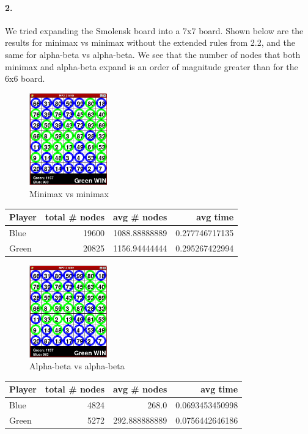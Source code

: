 \paragraph{2.}
We tried expanding the Smolensk board into a 7x7 board. Shown below are the results for minimax vs minimax without the extended rules from 2.2, and the same for alpha-beta vs alpha-beta. We see that the number of nodes that both minimax and alpha-beta expand is an order of magnitude greater than for the 6x6 board.

\begin{figure}[H]
\centering
\includegraphics[width=0.3\textwidth]{graphics/mm_bigger_7x7.png}
\caption{Minimax vs minimax}
\end{figure}
\begin{tabular}{l|r|r|r}
  Player & total \# nodes & avg \# nodes & avg time \\
  \hline
  Blue & 19600 & 1088.88888889 & 0.277746717135 \\
  Green & 20825 & 1156.94444444 & 0.295267422994 \\
\end{tabular}

\begin{figure}[H]
\centering
\includegraphics[width=0.3\textwidth]{graphics/aa_bigger_7x7.png}
\caption{Alpha-beta vs alpha-beta}
\end{figure}
\begin{tabular}{l|r|r|r}
  Player & total \# nodes & avg \# nodes & avg time \\
  \hline
  Blue & 4824 & 268.0 & 0.0693453450998 \\
  Green & 5272 & 292.888888889 & 0.0756442646186 \\
\end{tabular}

